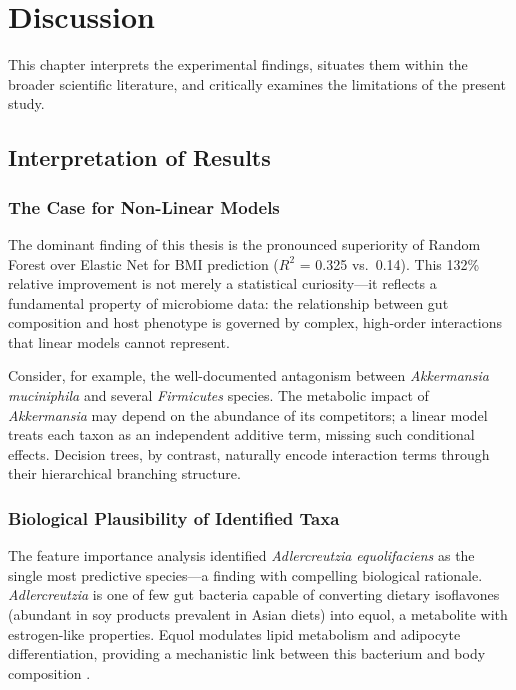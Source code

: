 
\chapter{Discussion}
\label{ch:discussion}

This chapter interprets the experimental findings, situates them within the broader scientific literature, and critically examines the limitations of the present study.

\section{Interpretation of Results}

\subsection{The Case for Non-Linear Models}

The dominant finding of this thesis is the pronounced superiority of Random Forest over Elastic Net for BMI prediction ($R^2$ = 0.325 vs.\ 0.14). This 132\% relative improvement is not merely a statistical curiosity---it reflects a fundamental property of microbiome data: the relationship between gut composition and host phenotype is governed by complex, high-order interactions that linear models cannot represent.

Consider, for example, the well-documented antagonism between \emph{Akkermansia muciniphila} and several \emph{Firmicutes} species. The metabolic impact of \emph{Akkermansia} may depend on the abundance of its competitors; a linear model treats each taxon as an independent additive term, missing such conditional effects. Decision trees, by contrast, naturally encode interaction terms through their hierarchical branching structure.

\subsection{Biological Plausibility of Identified Taxa}

The feature importance analysis identified \emph{Adlercreutzia equolifaciens} as the single most predictive species---a finding with compelling biological rationale. \emph{Adlercreutzia} is one of few gut bacteria capable of converting dietary isoflavones (abundant in soy products prevalent in Asian diets) into equol, a metabolite with estrogen-like properties. Equol modulates lipid metabolism and adipocyte differentiation, providing a mechanistic link between this bacterium and body composition \cite{setchell2002equol}.


